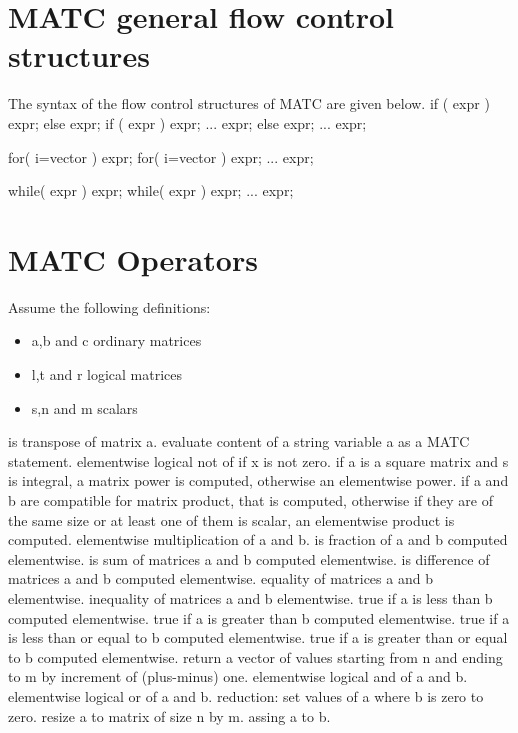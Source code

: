 \section{MATC general flow control structures}

The syntax of the flow control structures of MATC are given below. 
\ttbegin
if ( expr ) expr; else expr;
if ( expr )
{
    expr;
    ...
    expr;
} else {
    expr;
    ...
    expr;
}

for( i=vector ) expr;
for( i=vector )
{
    expr;
    ...
    expr;
}

while( expr ) expr;
while( expr )
{
    expr;
    ...
    expr;
}
\ttend



\section{MATC Operators}

Assume the following definitions:
\begin{itemize}
\item a,b and c ordinary matrices  
\item l,t and r logical matrices 
\item s,n and m scalars 
\end{itemize}

\sifbegin
{} is transpose of matrix a. 
 evaluate content of a string variable a as a MATC statement. 
 elementwise logical not of  if x is not zero. 
 if a is a square matrix and s is integral, a matrix power is computed, otherwise an elementwise power. 
 if a and b are compatible for matrix product, that is computed, 
otherwise if they are of the same size or at least one of them is scalar, an elementwise product is computed. 
elementwise multiplication of a and b.  
 is fraction of a and b computed elementwise. 
 is sum of matrices a and b computed elementwise. 
 is difference of matrices a and b computed elementwise. 
 equality of matrices a and b elementwise.  
 inequality of matrices a and b elementwise.  
 true if a is less than b computed elementwise. 
 true if a is greater than b computed elementwise.
 true if a is less than or equal to b computed elementwise. 
 true if a is greater than or equal to b computed elementwise. 
 return a vector of values starting from n and ending to m by increment of (plus-minus) one.  
 elementwise logical and of a and b. 
 elementwise logical or of a and b. 
 reduction: set values of a where b is zero to zero. 
 resize a to matrix of size n by m. 
 assing a to b. 
\sifend


